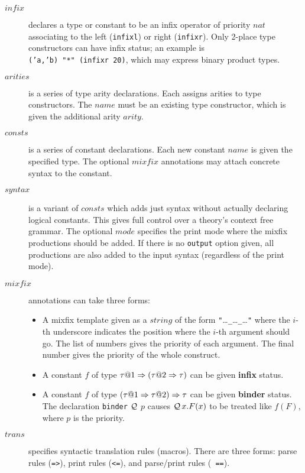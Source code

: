 \begin{description}
\item[$infix$]
  declares a type or constant to be an infix operator of priority $nat$
  associating to the left ({\tt infixl}) or right ({\tt infixr}). Only
  2-place type constructors can have infix status; an example is {\tt
  ('a,'b)~"*"~(infixr~20)}, which may express binary product types.

\item[$arities$] is a series of type arity declarations.  Each assigns
  arities to type constructors.  The $name$ must be an existing type
  constructor, which is given the additional arity $arity$.
  
\item[$consts$] is a series of constant declarations.  Each new
  constant $name$ is given the specified type.  The optional $mixfix$
  annotations may attach concrete syntax to the constant.
  
\item[$syntax$]  is a variant
  of $consts$ which adds just syntax without actually declaring
  logical constants.  This gives full control over a theory's context
  free grammar. The optional $mode$ specifies the print mode where the
  mixfix productions should be added. If there is no \texttt{output}
  option given, all productions are also added to the input syntax
  (regardless of the print mode).

\item[$mixfix$] 
  annotations can take three forms:
  \begin{itemize}
  \item A mixfix template given as a $string$ of the form
    {\tt"}\dots{\tt\_}\dots{\tt\_}\dots{\tt"} where the $i$-th underscore
    indicates the position where the $i$-th argument should go.  The list
    of numbers gives the priority of each argument.  The final number gives
    the priority of the whole construct.

  \item A constant $f$ of type $\tau@1\To(\tau@2\To\tau)$ can be given {\bf
    infix} status.

  \item A constant $f$ of type $(\tau@1\To\tau@2)\To\tau$ can be given {\bf
    binder} status.  The declaration {\tt binder} $\cal Q$ $p$ causes
  ${\cal Q}\,x.F(x)$ to be treated
  like $f(F)$, where $p$ is the priority.
  \end{itemize}

\item[$trans$]
  specifies syntactic translation rules (macros).  There are three forms:
  parse rules ({\tt =>}), print rules ({\tt <=}), and parse/print rules ({\tt
  ==}).


\end{description}

